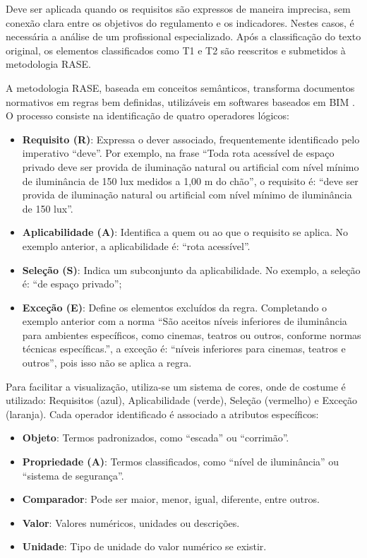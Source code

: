 Deve ser aplicada quando os requisitos são expressos de maneira imprecisa, sem conexão clara entre os objetivos do regulamento e os indicadores. Nestes casos, é necessária a análise de um profissional especializado. Após a classificação do texto original, os elementos classificados como T1 e T2 são reescritos e submetidos à metodologia RASE.

A metodologia RASE, baseada em conceitos semânticos, transforma documentos normativos em regras bem definidas, utilizáveis em softwares baseados em BIM \cite{hjelseth2011}. O processo consiste na identificação de quatro operadores lógicos:

\begin{itemize}
    \item \textbf{Requisito (R)}: Expressa o dever associado, frequentemente identificado pelo imperativo “deve”. Por exemplo, na frase “Toda rota acessível de espaço privado deve ser provida de iluminação natural ou artificial com nível mínimo de iluminância de 150 lux medidos a 1,00 m do chão”, o requisito é: “deve ser provida de iluminação natural ou artificial com nível mínimo de iluminância de 150 lux”.
    \item \textbf{Aplicabilidade (A)}: Identifica a quem ou ao que o requisito se aplica. No exemplo anterior, a aplicabilidade é: “rota acessível”.
    \item \textbf{Seleção (S)}: Indica um subconjunto da aplicabilidade. No exemplo, a seleção é: “de espaço privado”;
    \item \textbf{Exceção (E)}: Define os elementos excluídos da regra. Completando o exemplo anterior com a norma “São aceitos níveis inferiores de iluminância para ambientes específicos, como cinemas, teatros ou outros, conforme normas técnicas específicas.”, a exceção é: “níveis inferiores para cinemas, teatros e outros”, pois isso não se aplica a regra. 
\end{itemize}

Para facilitar a visualização, utiliza-se um sistema de cores, onde de costume é utilizado: Requisitos (azul), Aplicabilidade (verde), Seleção (vermelho) e Exceção (laranja). Cada operador identificado é associado a atributos específicos:
\begin{itemize}
    \item \textbf{Objeto}: Termos padronizados, como “escada” ou “corrimão”.
    \item \textbf{Propriedade (A)}: Termos classificados, como “nível de iluminância” ou “sistema de segurança”.
    \item \textbf{Comparador}: Pode ser maior, menor, igual, diferente, entre outros.
    \item \textbf{Valor}: Valores numéricos, unidades ou descrições.
    \item \textbf{Unidade}: Tipo de unidade do valor numérico se existir. 
\end{itemize}

